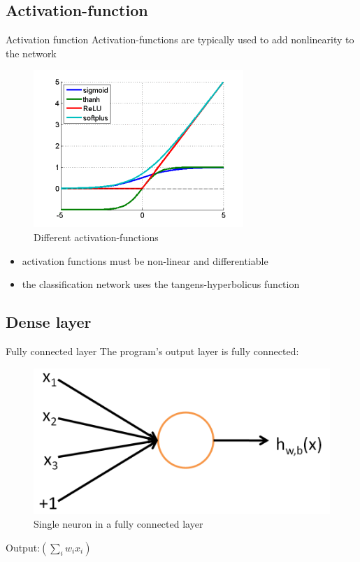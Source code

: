 \documentclass[12pt]{beamer}
\begin{document}
\subsection{Activation-function}
\begin{frame}{Activation function}
Activation-functions are typically used  to add nonlinearity to the network
\begin{figure}
\centering
\includegraphics[width = 0.4\linewidth]{images/activation_functions.png}
\caption{Different activation-functions}
\label{fig:activation function}
\end{figure}
\begin{itemize}
\item activation functions must be non-linear and differentiable
\item the classification network uses the tangens-hyperbolicus function
\end{itemize}
\end{frame}




\subsection{Dense layer}

\begin{frame}{Fully connected layer}
The program's output layer is fully connected:
\begin{figure}
\centering
\includegraphics[width = 0.6\linewidth]{images/SingleNeuron.png}
\caption{Single neuron in a fully connected layer}
\label{fig:principle}
\end{figure}

Output:\space\space\space\space\space\space\space$(\sum_{i}{w_i x_i})$ \newline



\end{frame}
\end{document}
